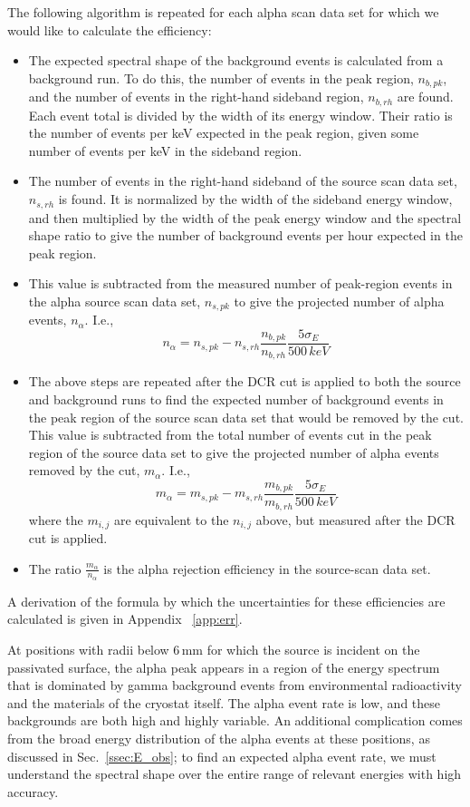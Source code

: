 The following algorithm is repeated for each alpha scan data set for which we would like to calculate the efficiency:
\begin{itemize}
\item The expected spectral shape of the background events is calculated from a background run. To do this, the number of events in the peak region, $n_{b, pk}$, and the number of events in the right-hand sideband region, $n_{b, rh}$ are found. Each event total is divided by the width of its energy window. Their ratio is the number of events per keV expected in the peak region, given some number of events per keV in the sideband region.
\item The number of events in the right-hand sideband of the source scan data set, $n_{s, rh}$ is found. It is normalized by the width of the sideband energy window, and then multiplied by the width of the peak energy window and the spectral shape ratio to give the number of background events per hour expected in the peak region. 
\item This value is subtracted from the measured number of peak-region events in the alpha source scan data set, $n_{s, pk}$ to give the projected number of alpha events, $n_{\alpha}$. I.e., 
$$ n_{\alpha} =  n_{s, pk}-n_{s, rh}\frac{n_{b, pk}}{n_{b, rh}}\frac{5\sigma_E}{500\,keV} $$
\item The above steps are repeated after the DCR cut is applied to both the source and background runs to find the expected number of background events in the peak region of the source scan data set that would be removed by the cut. This value is subtracted from the total number of events cut in the peak region of the source data set to give the projected number of alpha events removed by the cut, $m_\alpha$. I.e.,
 $$ m_{\alpha} =  m_{s, pk}-m_{s, rh}\frac{m_{b, pk}}{m_{b, rh}}\frac{5\sigma_E}{500\,keV} $$
 where the $m_{i, j}$ are equivalent to the $n_{i, j}$ above, but measured after the DCR cut is applied. 
\item The ratio $\frac{m_\alpha}{n_\alpha}$ is the alpha rejection efficiency in the source-scan data set. 
\end{itemize}

A derivation of the formula by which the uncertainties for these efficiencies are calculated is given in Appendix ~\ref{app:err}. 

At positions with radii below 6\,mm for which the source is incident on the passivated surface, the alpha peak appears in a region of the energy spectrum that is dominated by gamma background events from environmental radioactivity and the materials of the cryostat itself. The alpha event rate is low, and these backgrounds are both high and highly variable. An additional complication comes from the broad energy distribution of the alpha events at these positions, as discussed in Sec.~\ref{ssec:E_obs}; to find an expected alpha event rate, we must understand the spectral shape over the entire range of relevant energies with high accuracy. 


